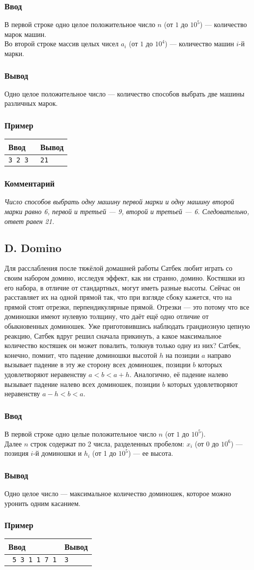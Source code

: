 \documentclass[10pt, a4paper]{article}
\newcommand{\informat}[1]
{
	\subsubsection*{Ввод} #1
}
\newcommand{\outformat}[1]
{
	\subsubsection*{Вывод} #1
}
\newcommand{\example}[2]
{
	\subsubsection*{Пример}
	\noindent
	\begin{center}
	\begin{tabularx}{\linewidth}{|X|X|}
	\hline
	Ввод & Вывод \\
	\hline
	{\tt #1} & {\tt #2}		\\
	\hline
	\end{tabularx}
	\end{center}
}
\newcommand{\excomm}[1]
{
	\subsubsection*{Комментарий}
	\textit{#1}
}
\begin{document}
\informat{В первой строке одно целое положительное число $n$ (от $1$ до $10^5$) --- количество марок машин.\\Во второй строке массив целых чисел $a_i$ (от $1$ до $10^4$) --- количество машин $i$-й марки.}

\outformat{Одно целое положительное число --- количество способов выбрать две машины различных марок.}

\example{3 	\newline 3 2 3 }{21}

\excomm{Число способов выбрать одну машину первой марки и одну машину второй марки равно 6, первой и третьей --- 9, второй и третьей --- 6. Следовательно, ответ равен 21.}



\subsection*{D. Domino}

Для расслабления после тяжёлой домашней работы Сатбек любит играть со своим набором домино, исследуя эффект, как ни странно, домино. Костяшки из его набора, в отличие от стандартных, могут иметь разные высоты. Сейчас он расставляет их на одной прямой так, что при взгляде сбоку кажется, что на прямой стоят отрезки, перпендикулярные прямой. Отрезки --- это потому что все доминошки имеют нулевую толщину, что даёт ещё одно отличие от обыкновенных доминошек. Уже приготовившись наблюдать грандиозную цепную реакцию, Сатбек вдруг решил сначала прикинуть, а какое максимальное количество костяшек он может повалить, толкнув только одну из них? Сатбек, конечно, помнит, что падение доминошки высотой $h$ на позиции $a$ направо вызывает падение в эту же сторону всех доминошек, позиции $b$ которых удовлетворяют неравенству $a < b < a + h$. Аналогично, её падение налево вызывает падение налево всех доминошек, позиции $b$ которых удовлетворяют неравенству $a - h < b < a$.

\informat{В первой строке одно целые положительное число $n$ (от $1$ до $10^5$).\\
Далее $n$ строк содержат по 2 числа, разделенных пробелом: $x_i$ (от 0 до $10^6$) --- позиция $i$-й доминошки и $h_i$ (от 1 до $10^5$) --- ее высота.}

\outformat{Одно целое число --- максимальное количество доминошек, которое можно уронить одним касанием.}

\example{%
5	 \newline
0 3	 \newline
1 1  \newline
5 1  \newline
7 7	 \newline
9 1}{3}
\end{document}
